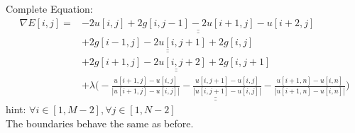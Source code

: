 \documentclass[12pt]{article}
\def\doubleunderline#1{\underline{\underline{#1}}}
\begin{document}
Complete Equation:
{\scriptsize  
	\setlength{\abovedisplayskip}{6pt}
	\setlength{\belowdisplayskip}{\abovedisplayskip}
	\setlength{\abovedisplayshortskip}{0pt}
	\setlength{\belowdisplayshortskip}{3pt}
    \begin{align*}
        \nabla E[i,j] =   & \doubleunderline{- 2u[i,j] + 2g[i,j-1] - 2u[i+1,j] - u[i+2,j] } \\
        & \doubleunderline{+ 2g[i-1,j] - 2u[i,j+1] + 2g[i,j] } \\ 
        & \doubleunderline{+ 2g[i+1,j] - 2u[i,j+2] + 2g[i,j+1] } \\
        & \doubleunderline{+ \lambda \Bigg(-\frac{u[i + 1,j] - u[i,j]}{|u[i + 1,j] - u[i,j]|} - \frac{u[i, j + 1] - u[i,j]}{|u[i, j + 1] - u[i,j]|} -\frac{u[i + 1,n] - u[i,n]}{|u[i + 1,n] - u[i,n]|} \Bigg) }
    \end{align*}
}%
hint: $\forall i \in [1,M-2], \forall j \in [1,N-2]$ \\
The boundaries behave the same as before.
\end{document}
